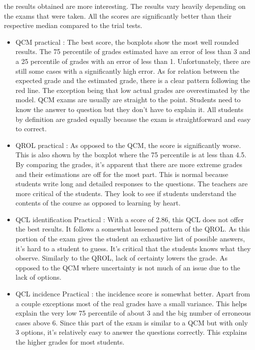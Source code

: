 \documentclass[a4paper,11pt]{report}
\numberwithin{figure}{section} %
\begin{document}
	the results obtained are more interesting.
	The results vary heavily depending on the exams that were taken.
	All the scores are significantly better than their respective median compared to the trial tests.
    \begin{itemize}
    \item[\textbullet]  QCM practical : The best score, the boxplots show the most well rounded results.
    The 75 percentile of grades estimated have an error of less than 3 and a 25 percentile of grades with an error of less than 1.
    Unfortunately, there are still some cases with a significantly high error.
    As for relation between the expected grade and the estimated grade, there is a clear pattern following the red line.
    The exception being that low actual grades are overestimated by the model.
    QCM exams are usually are straight to the point.
    Students need to know the answer to question but they don't have to explain it.
    All students by definition are graded equally because the exam is straightforward and easy to correct.
    \item[\textbullet]  QROL practical : As opposed to the QCM, the score is significantly worse.
    This is also shown by the boxplot where the 75 percentile is at less than 4.5. By comparing the grades, it's apparent that there are more extreme grades and their estimations are off for the most part.
    This is normal because students write long and detailed responses to the questions.
    The teachers are more critical of the students.
    They look to see if students understand the contents of the course as opposed to learning by heart.
    \item[\textbullet]  QCL identification Practical : With a score of 2.86, this QCL does not offer the best results.
    It follows a somewhat lessened pattern of the QROL. As this portion of the exam gives the student an exhaustive list of possible answers, it's hard to a student to guess.
    It's critical that the students knows what they observe.
    Similarly to the QROL, lack of certainty lowers the grade.
    As opposed to the QCM where uncertainty is not much of an issue due to the lack of options.
    \item[\textbullet]  QCL incidence Practical : the incidence score  is somewhat better.
    Apart from a couple exceptions most of the real grades have a small variance.
    This helps explain the very low 75 percentile of about 3 and the big number of erroneous cases above 6.
    Since this part of the exam is similar to a QCM but with only 3 options, it's relatively easy to answer the questions correctly.
    This explains the higher grades for most students.
    \end{itemize}
    
\end{document}
